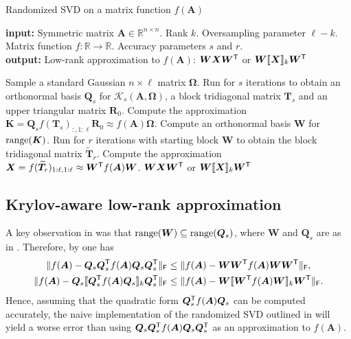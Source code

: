 \begin{algorithm}
\caption{Randomized SVD on a matrix function $f(\bm{A})$}
\label{alg:rsvd_matfun}
\textbf{input:} Symmetric matrix $\bm{A} \in \mathbb{R}^{n \times n}$. Rank $k$. Oversampling parameter $\ell -k$. Matrix function $f: \mathbb{R} \to \mathbb{R}$. Accuracy parameters $s$ and $r$. \\
\textbf{output:} Low-rank approximation to $f(\bm{A})$: $\bm{W}\bm{X} \bm{W}^{\textsf{\textup{T}}}$ or $\bm{W}\llbracket \bm{X}\rrbracket_k \bm{W}^{\textsf{\textup{T}}}$
\begin{algorithmic}[1]
    \State Sample a standard Gaussian $n \times \ell $ matrix $\bm{\Omega}$.
    \State Run  for $s$ iterations to obtain an orthonormal basis $\bm{Q}_s$ for $\mathcal{K}_s(\bm{A},\bm{\Omega})$, a block tridiagonal matrix $\bm{T}_s$ and an upper triangular matrix $\bm{R}_0$.
    \State Compute the approximation $\bm{K} = \bm{Q}_s f(\bm{T}_s)_{:,1:\ell} \bm{R}_0 \approx f(\bm{A}) \bm{\Omega}$.
    \State Compute an orthonormal basis $\bm{W}$ for $\operatorname{range}(\bm{K})$. 
    \State Run  for $r$ iterations with starting block $\bm{W}$ to obtain the block tridiagonal matrix $\widetilde{\bm{T}}_r$. 
    \State Compute the approximation $\bm{X} = f(\widetilde{\bm{T}}_r)_{1:\ell,1:\ell} \approx \bm{W}^{\textsf{\textup{T}}} f(\bm{A}) \bm{W}$.\label{line:X}
    \State \Return $\bm{W} \bm{X} \bm{W}^{\textsf{\textup{T}}}$ or $\bm{W} \llbracket \bm{X} \rrbracket_k \bm{W}^{\textsf{\textup{T}}}$
\end{algorithmic}
\end{algorithm}

\subsection{Krylov-aware low-rank approximation}
A key observation in \cite{chen_hallman_23} was that $\operatorname{range}(\bm{W}) \subseteq \operatorname{range}(\bm{Q}_s)$, where $\bm{W}$ and $\bm{Q}_s$ are as in . Therefore, by \cite[Lemma 3.3]{funnystrom2} one has
\begin{align*}
    \|f(\bm{A}) - \bm{Q}_s \bm{Q}_s^{\textsf{\textup{T}}} f(\bm{A})\bm{Q}_s \bm{Q}_s^{\textsf{\textup{T}}}\|_{\textsf{\textup{F}}} &\leq \|f(\bm{A}) - \bm{W} \bm{W}^{\textsf{\textup{T}}} f(\bm{A})\bm{W} \bm{W}^{\textsf{\textup{T}}}\|_{\textsf{\textup{F}}},\\
    \|f(\bm{A}) - \bm{Q}_s \llbracket \bm{Q}_s^{\textsf{\textup{T}}} f(\bm{A})\bm{Q}_s \rrbracket_k \bm{Q}_s^{\textsf{\textup{T}}}\|_{\textsf{\textup{F}}} &\leq \|f(\bm{A}) - \bm{W} \llbracket \bm{W}^{\textsf{\textup{T}}} f(\bm{A})\bm{W} \rrbracket_k \bm{W}^{\textsf{\textup{T}}}\|_{\textsf{\textup{F}}}.
\end{align*}
Hence, assuming that the quadratic form $\bm{Q}_s^{\textsf{\textup{T}}} f(\bm{A}) \bm{Q}_s$ can be computed accurately, the naive implementation of the randomized SVD outlined in  will yield a worse error than using $\bm{Q}_s\bm{Q}_s^{\textsf{\textup{T}}} f(\bm{A}) \bm{Q}_s \bm{Q}_s^{\textsf{\textup{T}}}$ as an approximation to $f(\bm{A})$.%

